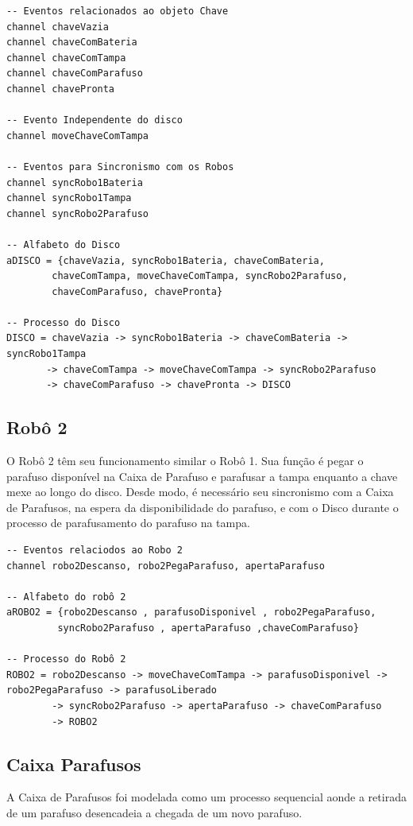 \documentclass[a4paper,11pt,twocolumns]{article}
\begin{document}
\begin{verbatim}
-- Eventos relacionados ao objeto Chave
channel chaveVazia
channel chaveComBateria
channel chaveComTampa
channel chaveComParafuso
channel chavePronta

-- Evento Independente do disco
channel moveChaveComTampa

-- Eventos para Sincronismo com os Robos
channel syncRobo1Bateria
channel syncRobo1Tampa
channel syncRobo2Parafuso

-- Alfabeto do Disco
aDISCO = {chaveVazia, syncRobo1Bateria, chaveComBateria,
        chaveComTampa, moveChaveComTampa, syncRobo2Parafuso,
        chaveComParafuso, chavePronta}

-- Processo do Disco
DISCO = chaveVazia -> syncRobo1Bateria -> chaveComBateria -> syncRobo1Tampa
       -> chaveComTampa -> moveChaveComTampa -> syncRobo2Parafuso
       -> chaveComParafuso -> chavePronta -> DISCO
\end{verbatim}

\subsection{Robô 2}
O Robô 2 têm seu funcionamento similar o Robô 1. Sua função é pegar o parafuso disponível na Caixa de Parafuso e parafusar a tampa enquanto a chave mexe ao longo do disco. Desde modo, é necessário seu sincronismo com a Caixa de Parafusos, na espera da disponibilidade do parafuso, e com o Disco durante o processo de parafusamento do parafuso na tampa.

\begin{verbatim}
-- Eventos relaciodos ao Robo 2
channel robo2Descanso, robo2PegaParafuso, apertaParafuso

-- Alfabeto do robô 2
aROBO2 = {robo2Descanso , parafusoDisponivel , robo2PegaParafuso,
         syncRobo2Parafuso , apertaParafuso ,chaveComParafuso}

-- Processo do Robô 2
ROBO2 = robo2Descanso -> moveChaveComTampa -> parafusoDisponivel -> robo2PegaParafuso -> parafusoLiberado
        -> syncRobo2Parafuso -> apertaParafuso -> chaveComParafuso
        -> ROBO2
\end{verbatim}

\subsection{Caixa Parafusos}
A Caixa de Parafusos foi modelada como um processo sequencial aonde a retirada de um parafuso desencadeia a chegada de um novo parafuso.
\end{document}
